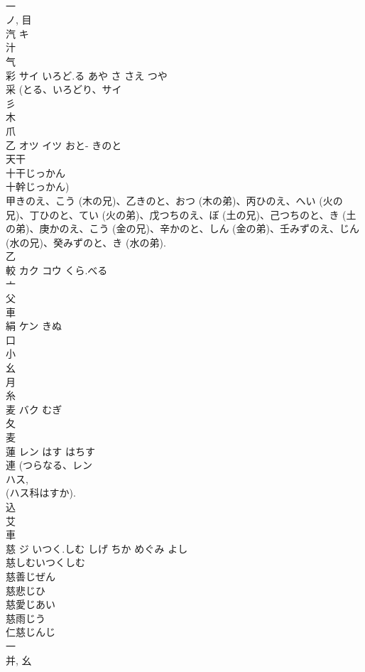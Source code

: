 \documentclass[8pt]{extreport}
\begin{document}
\begin{CJK}{UTF8}{min}
\\	一 
\\	ノ, 目 
\\	汽	キ		
\\	汁 
\\	气 
\\	彩	サイ	いろど.る あや さ さえ つや	
\\	采 (とる、いろどり、サイ 
\\	彡 
\\	木 
\\	爪 
\\	乙	オツ イツ	おと- きのと	
\\	天干 
\\	十干じっかん 
\\	十幹じっかん) 
\\	甲きのえ、こう (木の兄)、乙きのと、おつ (木の弟)、丙ひのえ、へい (火の兄)、丁ひのと、てい (火の弟)、戊つちのえ、ぼ (土の兄)、己つちのと、き (土の弟)、庚かのえ、こう (金の兄)、辛かのと、しん (金の弟)、壬みずのえ、じん (水の兄)、癸みずのと、き (水の弟). 
\\	乙 
\\	較	カク コウ	くら.べる	
\\	亠 
\\	父 
\\	車 
\\	絹	ケン	きぬ	
\\	口 
\\	小 
\\	幺 
\\	月 
\\	糸 
\\	麦	バク	むぎ	
\\	夂 
\\	麦 
\\	蓮	レン	はす はちす	
\\	連 (つらなる、レン 
\\	ハス, 
\\	(ハス科はすか). 
\\	込 
\\	艾 
\\	車 
\\	慈	ジ	いつく.しむ しげ ちか めぐみ よし	
\\	慈しむいつくしむ
\\	慈善じぜん
\\	慈悲じひ
\\	慈愛じあい
\\	慈雨じう
\\	仁慈じんじ
\\	一 
\\	并, 幺 

\end{CJK}
\end{document}
